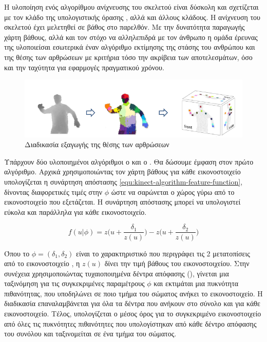Η υλοποίηση ενός αλγορίθμου ανίχνευσης του σκελετού είναι δύσκολη και σχετίζεται με τον κλάδο της υπολογιστικής όρασης \cite{mubarak97}, αλλά και άλλους κλάδους. Η ανίχνευση του σκελετού έχει μελετηθεί σε βάθος \cite{moseslund01, poppe07} στο παρελθόν. Με την δυνατότητα παραγωγής χάρτη βάθους, αλλά και τον στόχο να αλληλεπιδρά με τον άνθρωπο η ομάδα έρευνας της  υλοποιείσαι εσωτερικά έναν αλγόριθμο εκτίμησης της στάσης του ανθρώπου και της θέσης των αρθρώσεων \cite{shotton11} με κριτήρια τόσο την ακρίβεια των αποτελεσμάτων, όσο και την ταχύτητα για εφαρμογές πραγματικού χρόνου.

\begin{figure}[H]
    \centering
    \includegraphics[width=.9\textwidth, keepaspectratio]{fig/kinect-skeleton-algorithm.png}
    \caption{Διαδικασία εξαγωγής της θέσης των αρθρώσεων \cite{shotton11}}
    \label{fig:kinect-skeleton-algorithm}
\end{figure}

Υπάρχουν δύο υλοποιημένοι αλγόριθμοι ο  και ο . Θα δώσουμε έμφαση στον πρώτο αλγόριθμο. Αρχικά χρησιμοποιώντας τον χάρτη βάθους για κάθε εικονοστοιχείο υπολογίζεται η συνάρτηση απόστασης \ref{equ:kinect-algorithm-feature-function}, δίνοντας διαφορετικές τιμές στην $\phi$ ώστε να σαρώνεται ο χώρος γύρω από το εικονοστοιχείο που εξετάζεται. Η συνάρτηση απόστασης μπορεί να υπολογιστεί εύκολα και παράλληλα για κάθε εικονοστοιχείο.

\begin{equation}
    f(u|\phi ) = z\big( u + \frac{\delta_1}{z(u)}\big)-z\big( u + \frac{\delta_2}{z(u)}\big)
    \label{equ:kinect-algorithm-feature-function}
\end{equation}

Όπου το $\phi = (\delta_1, \delta_2)$ είναι το χαρακτηριστικό που περιγράφει τις 2 μετατοπίσεις από το εικονοστοιχείο , η $z(u)$ δίνει την τιμή βάθους του εικονοστοιχείου. Στην συνέχεια χρησιμοποιώντας τυχαιοποιημένα δέντρα απόφασης (), γίνεται μια ταξινόμηση για τις συγκεκριμένες παραμέτρους $\phi$ και εκτιμάται μια πυκνότητα πιθανότητας, που υποδηλώνει σε ποιο τμήμα του σώματος ανήκει το εικονοστοιχείο. Η διαδικασία επαναλαμβάνεται για όλα τα δέντρα που ανήκουν στο σύνολο και για κάθε εικονοστοιχείο. Τέλος, υπολογίζεται ο μέσος όρος για το συγκεκριμένο εικονοστοιχείο από όλες τις πυκνότητες πιθανότητες που υπολογίστηκαν από κάθε δέντρο απόφασης του συνόλου και ταξινομείται σε ένα τμήμα του σώματος.


